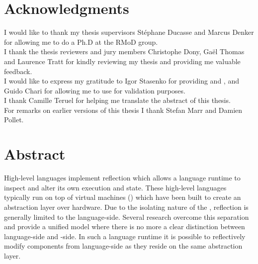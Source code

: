 \documentclass[a4paper,11pt,twoside]{include/ThesisStyle}
\begin{document}


\dominitoc

\cleardoublepage
\chapter*{Acknowledgments}

I would like to thank my thesis supervisors Stéphane Ducasse and Marcus Denker for allowing me to do a Ph.D at the RMoD group.\\

\noindent I thank the thesis reviewers and jury members Christophe Dony, Gaël Thomas and Laurence Tratt for kindly reviewing my thesis and providing me valuable feedback.\\

\noindent I would like to express my gratitude to Igor Stasenko for providing \B and \NB, and Guido Chari for allowing me to use \WF for validation purposes.\\

\noindent I thank Camille Teruel for helping me translate the abstract of this thesis. \\

\noindent For remarks on earlier versions of this thesis I thank Stefan Marr and Damien Pollet.



\chapter*{Abstract}
High-level languages implement reflection which allows a language runtime to inspect and alter its own execution and state.
These high-level languages typically run on top of virtual machines (\VMs) which have been built to create an abstraction layer over hardware.
Due to the isolating nature of the \VM, reflection is generally limited to the language-side.
Several research \VMs overcome this separation and provide a unified model where there is no more a clear distinction between language-side and \VM-side.
In such a language runtime it is possible to reflectively modify \VM components from language-side as they reside on the same abstraction layer.
\end{document}
